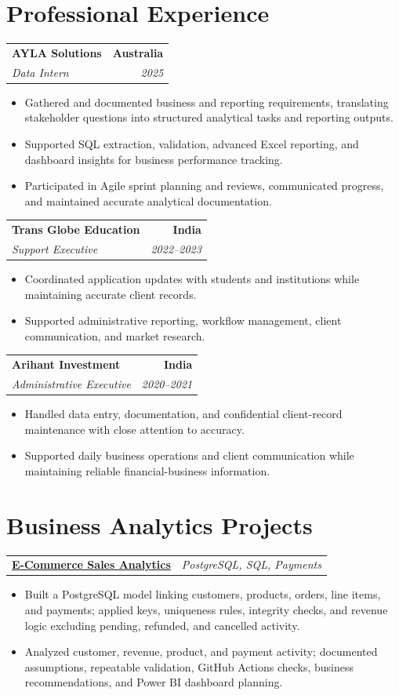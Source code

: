 \documentclass[letterpaper,10pt]{article}
\makeatletter
\newcommand{\role}[4]{%
  \begin{tabularx}{\textwidth}{@{}Xr@{}}
    \textbf{#1} & \textbf{#2} \\
    \textit{#3} & \textit{#4}
  \end{tabularx}\vspace{-1pt}
}
\newcommand{\project}[2]{%
  \begin{tabularx}{\textwidth}{@{}Xr@{}}
    \textbf{#1} & \textit{#2}
  \end{tabularx}\vspace{-1pt}
}
\makeatother
\begin{document}
\section{Professional Experience}
\role{AYLA Solutions}{Australia}{Data Intern}{2025}
\begin{itemize}
  \item Gathered and documented business and reporting requirements, translating stakeholder questions into structured analytical tasks and reporting outputs.
  \item Supported SQL extraction, validation, advanced Excel reporting, and dashboard insights for business performance tracking.
  \item Participated in Agile sprint planning and reviews, communicated progress, and maintained accurate analytical documentation.
\end{itemize}
\vspace{1pt}

\role{Trans Globe Education}{India}{Support Executive}{2022--2023}
\begin{itemize}
  \item Coordinated application updates with students and institutions while maintaining accurate client records.
  \item Supported administrative reporting, workflow management, client communication, and market research.
\end{itemize}
\vspace{1pt}

\role{Arihant Investment}{India}{Administrative Executive}{2020--2021}
\begin{itemize}
  \item Handled data entry, documentation, and confidential client-record maintenance with close attention to accuracy.
  \item Supported daily business operations and client communication while maintaining reliable financial-business information.
\end{itemize}

\section{Business Analytics Projects}
\project{\href{https://github.com/jainalimehta/Ecommerce-Sales-Analytics}{E-Commerce Sales Analytics}}{PostgreSQL, SQL, Payments}
\begin{itemize}
  \item Built a PostgreSQL model linking customers, products, orders, line items, and payments; applied keys, uniqueness rules, integrity checks, and revenue logic excluding pending, refunded, and cancelled activity.
  \item Analyzed customer, revenue, product, and payment activity; documented assumptions, repeatable validation, GitHub Actions checks, business recommendations, and Power BI dashboard planning.
\end{itemize}
\vspace{1pt}
\end{document}
